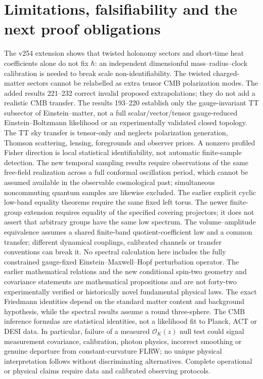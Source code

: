 \documentclass[aps,prd,onecolumn,notitlepage,groupedaddress,11pt]{revtex4-2}
\begin{document}
\section{Limitations, falsifiability and the next proof obligations}
The v254 extension shows that twisted holonomy sectors and short-time heat coefficients alone do not fix $\hbar$: an independent dimensionful mass--radius--clock calibration is needed to break scale non-identifiability. The twisted charged-matter sectors cannot be relabelled as extra tensor CMB polarization modes. The added results 221--232 correct invalid proposed extrapolations; they do not add a realistic CMB transfer. The results 193--220 establish only the gauge-invariant TT subsector of Einstein--matter, not a full scalar/vector/tensor gauge-reduced Einstein--Boltzmann likelihood or an experimentally validated closed topology. The TT sky transfer is tensor-only and neglects polarization generation, Thomson scattering, lensing, foregrounds and observer priors. A nonzero profiled Fisher direction is local statistical identifiability, not automatic finite-sample detection. The new temporal sampling results require observations of the same free-field realization across a full conformal oscillation period, which cannot be assumed available in the observable cosmological past; simultaneous noncommuting quantum samples are likewise excluded. The earlier explicit cyclic low-band equality theorems require the same fixed left torus. The newer finite-group extension requires equality of the specified covering projectors; it does not assert that arbitrary groups have the same low spectrum. The volume--amplitude equivalence assumes a shared finite-band quotient-coefficient law and a common transfer; different dynamical couplings, calibrated channels or transfer conventions can break it. No spectral calculation here includes the fully constrained gauge-fixed Einstein--Maxwell--Hopf perturbation operator. The earlier mathematical relations and the new conditional spin-two geometry and covariance statements are mathematical propositions and are not forty-two experimentally verified or historically novel fundamental physical laws. The exact Friedmann identities depend on the standard matter content and background hypothesis, while the spectral results assume a round three-sphere. The CMB inference formulas are statistical identities, not a likelihood fit to Planck, ACT or DESI data. In particular, failure of a measured $\mathcal O_K(z)$ null test could signal measurement covariance, calibration, photon physics, incorrect smoothing or genuine departure from constant-curvature FLRW; no unique physical interpretation follows without discriminating alternatives. Complete operational or physical claims require data and calibrated observing protocols.
\end{document}
